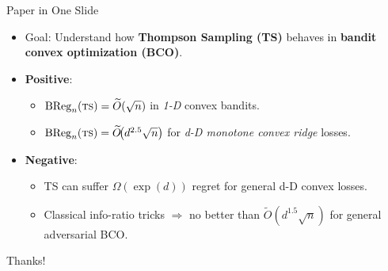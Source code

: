 \documentclass{beamer}
\newcommand{\BReg}{\operatorname{BReg}}
\newcommand{\ts}{{\textsc{ts}}}
\begin{document}
\begin{frame}{Paper in One Slide}
    \begin{itemize}
        \item \alert{Goal}: Understand how \textbf{Thompson Sampling (TS)} behaves in \textbf{bandit convex optimization (BCO)}.
        \item \textbf{Positive}:
              \begin{itemize}
                  \item $\BReg_n(\ts) = \widetilde{O}(\sqrt{n})$ in \emph{1-D} convex bandits.
                  \item $\BReg_n(\ts) = \widetilde{O}\!\bigl(d^{2.5}\sqrt{n}\bigr)$ for \emph{d-D monotone convex ridge} losses.
              \end{itemize}
        \item \textbf{Negative}:
              \begin{itemize}
                  \item TS can suffer \(\Omega(\exp(d))\) regret for general d-D convex losses.
                  \item Classical info-ratio tricks \(\Rightarrow\) no better than \(\widetilde{O}(d^{1.5}\sqrt{n})\) for general adversarial BCO.
              \end{itemize}
    \end{itemize}
    \begin{center}
        Thanks!
    \end{center}
\end{frame}

\end{document}
